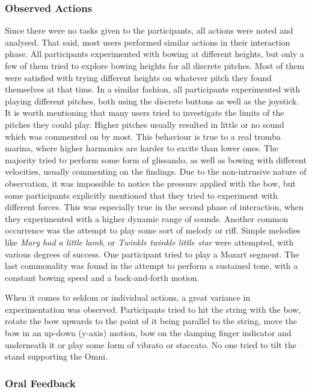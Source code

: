 \subsubsection{Observed Actions}
Since there were no tasks given to the participants, all actions were noted and analysed. That said, most users performed similar actions in their interaction phase. All participants experimented with bowing at different heights, but only a few of them tried to explore bowing heights for all discrete pitches. Most of them were satisfied with trying different heights on whatever pitch they found themselves at that time. In a similar fashion, all participants experimented with playing different pitches, both using the discrete buttons as well as the joystick. It is worth mentioning that many users tried to investigate the limits of the pitches they could play. Higher pitches usually resulted in little or no sound which was commented on by most. This behaviour is true to a real tromba marina, where higher harmonics are harder to excite than lower ones. The majority tried to perform some form of glissando, as well as bowing with different velocities, usually commenting on the findings. Due to the non-intrusive nature of observation, it was impossible to notice the pressure applied with the bow, but some participants explicitly mentioned that they tried to experiment with different forces. This was especially true in the second phase of interaction, when they experimented with a higher dynamic range of sounds. Another common occurrence was the attempt to play some sort of melody or riff. Simple melodies like \textit{Mary had a little lamb}, or \textit{Twinkle twinkle little star} were attempted, with various degrees of success. One participant tried to play a Mozart segment. The last commonality was found in the attempt to perform a sustained tone, with a constant bowing speed and a back-and-forth motion.

When it comes to seldom or individual actions, a great variance in experimentation was observed. Participants tried to hit the string with the bow, rotate the bow upwards to the point of it being parallel to the string, move the bow in an up-down (y-axis) motion, bow on the damping finger indicator and underneath it or play some form of vibrato or staccato. No one tried to tilt the stand supporting the Omni.

\subsubsection{Oral Feedback}

